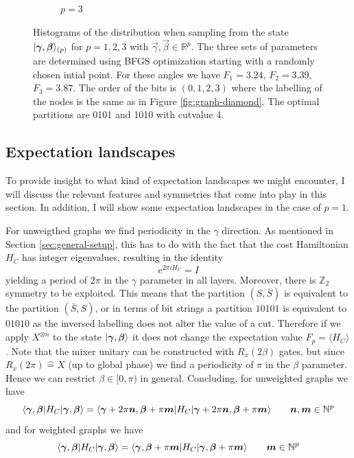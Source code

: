 \begin{figure}[H]
\begin{subfigure}[t]{0.62\textwidth}
		\captionsetup{justification=centering}
		\caption{$p=3$}
	\end{subfigure}
	\caption{Histograms of the distribution when sampling from the state $|\bm{\gamma},\bm{\beta}\rangle_{(p)}$ for $p=1,2,3$ with $\vec{\gamma},\vec{\beta} \in \mathbb{R}^p$. The three sets of parameters are determined using BFGS optimization starting with a randomly chosen intial point. For these angles we have $F_1 = 3.24$, $F_2 = 3.39$, $F_3 = 3.87$. The order of the bits is $(0,1,2,3)$ where the labelling of the nodes is the same as in Figure \ref{fig:graph-diamond}. The optimal partitions are 0101 and 1010 with cutvalue 4.}
\end{figure}

\newpage

\subsection{Expectation landscapes}
To provide insight to what kind of expectation landscapes we might encounter, I will discuss the relevant features and symmetries that come into play in this section. In addition, I will show some expectation landscapes in the case of $p=1$.

For unweigthed graphs we find periodicity in the $\gamma$ direction. As mentioned in Section \ref{sec:general-setup}, this has to do with the fact that the cost Hamiltonian $H_C$ has integer eigenvalues, resulting in the identity
\begin{equation}
e^{2\pi i H_C} = I
\end{equation}
yielding a period of $2\pi$ in the $\gamma$ parameter in all layers. Moreover, there is $\mathbb{Z}_2$ symmetry to be exploited. This means that the partition $(S,\bar{S})$ is equivalent to the partition $(\bar{S},S)$, or in terms of bit strings a partition $10101$ is equivalent to $01010$ as the inversed labelling does not alter the value of a cut. Therefore if we apply $X^{\otimes n}$ to the state $|\bm{\gamma},\bm{\beta}\rangle$ it does not change the expectation value $F_p = \langle H_C \rangle$. Note that the mixer unitary can be constructed with $R_x(2\beta)$ gates, but since $R_x(2\pi) \hat{=} X$ (up to global phase) we find a periodicity of $\pi$ in the $\beta$ parameter. Hence we can restrict $\beta \in [0,\pi)$ in general. Concluding, for unweighted graphs we have
\begin{equation}
\langle \bm{\gamma},\bm{\beta} |H_C | \bm{\gamma},\bm{\beta} \rangle = \langle \bm{\gamma} + 2\pi \bm{n}, \bm{\beta} + \pi\bm{m}|H_C|\bm{\gamma} + 2\pi \bm{n}, \bm{\beta} + \pi\bm{m}\rangle \qquad \bm{n},\bm{m} \in \mathbb{N}^p
\end{equation}
and for weighted graphs we have
\begin{equation}
\langle \bm{\gamma},\bm{\beta} |H_C | \bm{\gamma},\bm{\beta} \rangle = \langle \bm{\gamma}, \bm{\beta} + \pi\bm{m}|H_C|\bm{\gamma}, \bm{\beta} + \pi\bm{m}\rangle \qquad \bm{m} \in \mathbb{N}^p
\end{equation}

